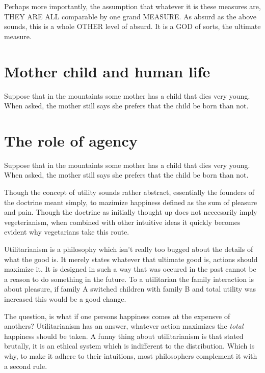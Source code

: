 \documentclass[12pt]{report}
\numberwithin{equation}{section}
\begin{document}
Perhaps more importantly, the assumption that whatever it is these measures are, THEY ARE ALL comparable by one grand MEASURE. As absurd as the above sounds, this is a whole OTHER level of absurd. It is a GOD of sorts, the ultimate measure. 

\section{Mother child and human life}

Suppose that in the mountaints some mother has a child that dies very young. When asked, the mother still says she prefers that the child be born than not. 

\section{The role of agency}

Suppose that in the mountaints some mother has a child that dies very young. When asked, the mother still says she prefers that the child be born than not. 








Though the concept of utility sounds rather abstract, essentially the founders of the doctrine meant simply, to mazimize happiness defined as the sum of pleasure and pain. Though the doctrine as initially thought up does not neccesarily imply vegeterianism, when combined with other intuitive ideas it quickly becomes evident why vegetarians take this route. 

Utilitarianism is a philosophy which isn't really too bugged about the details of what the good is. It merely states whatever that ultimate good is, actions should maximize it. It is designed in such a way that was occured in the past cannot be a reason to do something in the future.  To a utilitarian the family interaction is about pleasure, if family A switched children with family B and total utility was increased this would be a good change. 

The question, is what if one persons happiness comes at the expensve of anothers? Utilitarianism has an answer, whatever action maximizes the \textit{total} happiness should be taken. A funny thing about utilitarianism is that stated brutally, it is an ethical system which is indifferent to the distribution. Which is why, to make it adhere to their intuitions, most philosophers complement it with a second rule. 
\end{document}
